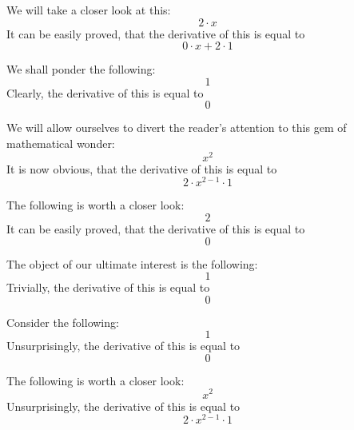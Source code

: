\documentclass{article}
\begin{document}
We will take a closer look at this:
\begin{equation}
2 \cdot x 
\end{equation}
It can be easily proved, that the derivative of this is equal to
\begin{equation}
0 \cdot x + 2 \cdot 1 
\end{equation}

We shall ponder the following:
\begin{equation}
1 
\end{equation}
Clearly, the derivative of this is equal to
\begin{equation}
0 
\end{equation}

We will allow ourselves to divert the reader's attention to this gem of mathematical wonder:
\begin{equation}
x ^{2 } 
\end{equation}
It is now obvious, that the derivative of this is equal to
\begin{equation}
2 \cdot x ^{2 - 1 } \cdot 1 
\end{equation}

The following is worth a closer look:
\begin{equation}
2 
\end{equation}
It can be easily proved, that the derivative of this is equal to
\begin{equation}
0 
\end{equation}

The object of our ultimate interest is the following:
\begin{equation}
1 
\end{equation}
Trivially, the derivative of this is equal to
\begin{equation}
0 
\end{equation}

Consider the following:
\begin{equation}
1 
\end{equation}
Unsurprisingly, the derivative of this is equal to
\begin{equation}
0 
\end{equation}

The following is worth a closer look:
\begin{equation}
x ^{2 } 
\end{equation}
Unsurprisingly, the derivative of this is equal to
\begin{equation}
2 \cdot x ^{2 - 1 } \cdot 1 
\end{equation}
\end{document}
